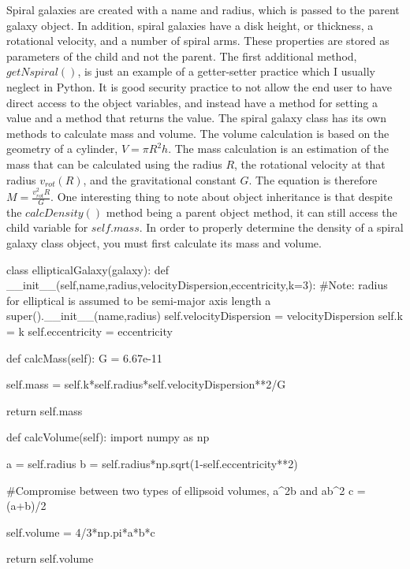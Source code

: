 \documentclass[twocolumn,11pt]{article}
\begin{document}
Spiral galaxies are created with a name and radius, which is passed to the parent galaxy object. In addition, spiral galaxies have a disk height, or thickness, a rotational velocity, and a number of spiral arms. These properties are stored as parameters of the child and not the parent. The first additional method, $getNspiral()$, is just an example of a getter-setter practice which I usually neglect in Python. It is good security practice to not allow the end user to have direct access to the object variables, and instead have a method for setting a value and a method that returns the value. The spiral galaxy class has its own methods to calculate mass and volume. The volume calculation is based on the geometry of a cylinder, $V=\pi R^2h$. The mass calculation is an estimation of the mass that can be calculated using the radius $R$, the rotational velocity at that radius $v_{rot}(R)$, and the gravitational constant $G$. The equation is therefore $M=\frac{v_{rot}^2R}{G}$. One interesting thing to note about object inheritance is that despite the $calcDensity()$ method being a parent object method, it can still access the child variable for $self.mass$. In order to properly determine the density of a spiral galaxy class object, you must first calculate its mass and volume.
\newpage

\begin{python}
class ellipticalGalaxy(galaxy):
    def __init__(self,name,radius,velocityDispersion,eccentricity,k=3):
        #Note: radius for elliptical is assumed to be semi-major axis length a
        super().__init__(name,radius)
        self.velocityDispersion = velocityDispersion
        self.k = k
        self.eccentricity = eccentricity
    
    def calcMass(self):
        G = 6.67e-11
        
        self.mass = self.k*self.radius*self.velocityDispersion**2/G
        
        return self.mass
    
    
    def calcVolume(self):
        import numpy as np
        
        a = self.radius
        b = self.radius*np.sqrt(1-self.eccentricity**2)
        
        #Compromise between two types of ellipsoid volumes, a^2b and ab^2
        c = (a+b)/2
        
        self.volume = 4/3*np.pi*a*b*c
        
        return self.volume
\end{python}
\end{document}
